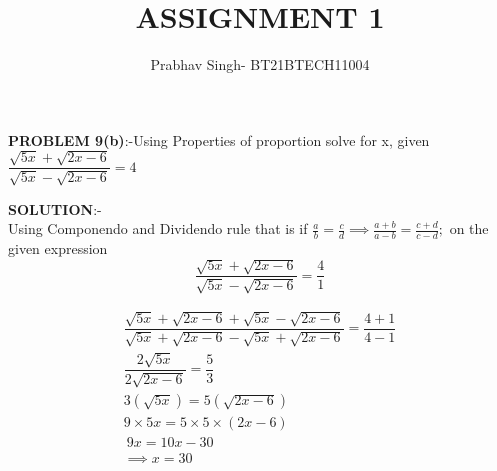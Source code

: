 \documentclass[journal,12pt,twocolumn]{IEEEtran}
\begin{document}
	\vspace{3cm}
	\title{ASSIGNMENT 1}
	\author{Prabhav Singh- BT21BTECH11004}
	
	\maketitle
	\textbf{PROBLEM 9(b)}:-Using Properties of proportion solve for x, given\\
	
	
	\hspace*{2cm}$ 	\dfrac{\sqrt{5x}+\sqrt{2x-6}}{\sqrt{5x}-\sqrt{2x-6}} =4 $
	
	
	\medskip
	
	
	\textbf{SOLUTION}:-\\
	Using Componendo and Dividendo rule that is if $  \frac{a}{b} =\frac{c}{d} \implies \frac{a+b}{a-b} =\frac{c+d}{c-d}; $ on the given expression\\
	
	 \begin{equation}
	 		\dfrac{\sqrt{5x}+\sqrt{2x-6}}{\sqrt{5x}-\sqrt{2x-6}} =\dfrac{4}{1} 
	 \end{equation}
	
	\begin{align}
		\dfrac{\sqrt{5x}+\sqrt{2x-6}+\sqrt{5x}-\sqrt{2x-6}}{\sqrt{5x}+\sqrt{2x-6}-\sqrt{5x}+\sqrt{2x-6}} =\dfrac{4+1}{4-1} \\ 
		\dfrac{2\sqrt{5x}}{2\sqrt{2x-6}} =\dfrac{5}{3} \\
		3(\sqrt{5x})=5(\sqrt{2x-6}) \\
		9\times5x=5\times5\times(2x-6) \\
		\ 9x=10x-30 \\
		\implies \boxed{ x=30} 
	\end{align}
	
	
	
\end{document}
